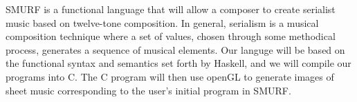 SMURF is a functional language that will allow a composer to create serialist music
based on twelve-tone composition. In general, serialism is a musical composition
technique where a set of values, chosen through some methodical process, generates
a sequence of musical elements. Our languge will be based on the functional syntax
and semantics set forth by Haskell, and we will compile our programs into C.
The C program will then use openGL to generate images of sheet music corresponding to the user's
initial program in SMURF.
